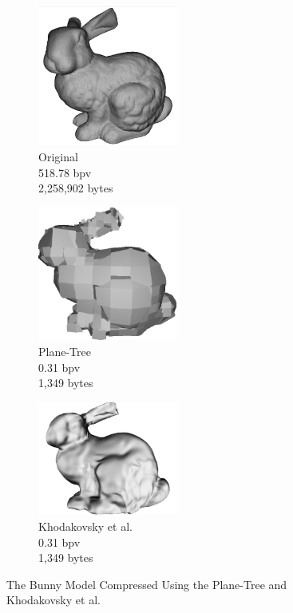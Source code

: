 \begin{figure}[H] 
        \begin{center}
 		\begin{subfigure}[b]{2in}
 			   \centering
 			   \includegraphics[width=1.8in]{images/experiments/pt_qual/original2}
                \caption{Original\\518.78 bpv\\2,258,902 bytes}
                \label{fig:FIG_BUNNYB}
        \end{subfigure}%
        \begin{subfigure}[b]{2in}
                \includegraphics[width=1.8in]{images/experiments/pt_qual/planetree2_shade}
                \caption{Plane-Tree\\0.31 bpv\\1,349 bytes}
                \label{fig:FIG_RABBITB}
        \end{subfigure}%
        \begin{subfigure}[b]{2in}
                \includegraphics[width=1.8in]{images/experiments/pt_qual/khodakovsky_shade}
                \caption{Khodakovsky et al. \cite{Khodakovsky00Progressive}\\0.31 bpv\\1,349 bytes}
                \label{fig:FIG_HORSEB}
        \end{subfigure}
       \caption{The Bunny Model Compressed Using the Plane-Tree and Khodakovsky et al.}
       \label{fig:qualSOTA2}
       \end{center}
\end{figure}


